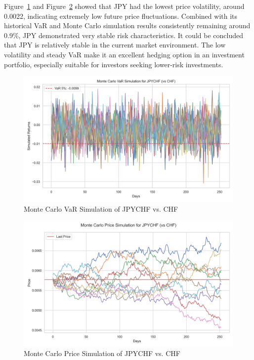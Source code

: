 \documentclass{article}
\begin{document}
Figure~\ref{fig:monte_carlo_var_simulation_JPYCHF_vs_CHF} and Figure~\ref{fig:monte_carlo_price_simulation_JPYCHF_vs_CHF} showed that JPY had the lowest price volatility, around 0.0022, indicating extremely low future price fluctuations. Combined with its historical VaR and Monte Carlo simulation results consistently remaining around 0.9\%, JPY demonstrated very stable risk characteristics. It could be concluded that JPY is relatively stable in the current market environment. The low volatility and steady VaR make it an excellent hedging option in an investment portfolio, especially suitable for investors seeking lower-risk investments.

\begin{figure}[H]
    \centering  \includegraphics[width=0.75\linewidth]{reports/figures/monte_carlo_var_simulation_JPYCHF_vs_CHF.png}
    \caption{Monte Carlo VaR Simulation of JPYCHF vs. CHF}   \label{fig:monte_carlo_var_simulation_JPYCHF_vs_CHF}
\end{figure}

\begin{figure}[H]
    \centering
    \includegraphics[width=0.75\linewidth]{reports/figures/monte_carlo_price_simulation_JPYCHF_vs_CHF.png}
    \caption{Monte Carlo Price Simulation of JPYCHF vs. CHF}  \label{fig:monte_carlo_price_simulation_JPYCHF_vs_CHF}
\end{figure}
\end{document}
